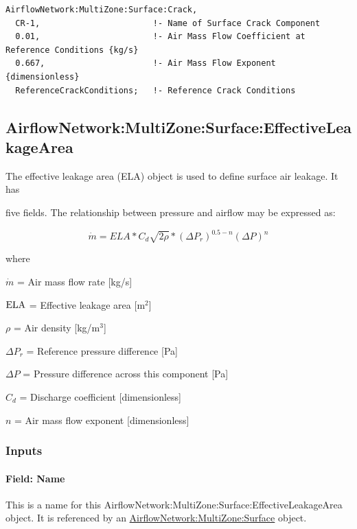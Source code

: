 \begin{lstlisting}
AirflowNetwork:MultiZone:Surface:Crack,
  CR-1,                       !- Name of Surface Crack Component
  0.01,                       !- Air Mass Flow Coefficient at Reference Conditions {kg/s}
  0.667,                      !- Air Mass Flow Exponent {dimensionless}
  ReferenceCrackConditions;   !- Reference Crack Conditions
\end{lstlisting}

\subsection{AirflowNetwork:MultiZone:Surface:EffectiveLeakageArea}\label{airflownetworkmultizonesurfaceeffectiveleakagearea}

The effective leakage area (ELA) object is used to define surface air leakage. It has

five fields. The relationship between pressure and airflow may be expressed as:

\begin{equation}
\dot m = ELA*{C_d}\sqrt {2\rho } *{\left( {\Delta {P_r}} \right)^{0.5 - n}}{\left( {\Delta P} \right)^n}
\end{equation}

where

\(\dot m\) = Air mass flow rate {[}kg/s{]}

\(\rm{ELA}\) = Effective leakage area {[}m\(^{2}\){]}

\(\rho\) = Air density {[}kg/m\(^{3}\){]}

\(\Delta {P_r}\) = Reference pressure difference {[}Pa{]}

\(\Delta P\) = Pressure difference across this component {[}Pa{]}

\(C_{d}\) = Discharge coefficient {[}dimensionless{]}

\(n\) = Air mass flow exponent {[}dimensionless{]}

\subsubsection{Inputs}\label{inputs-3-003}

\paragraph{Field: Name}\label{field-name-3-003}

This is a name for this AirflowNetwork:MultiZone:Surface:EffectiveLeakageArea object. It is referenced by an \hyperref[airflownetworkmultizonesurface]{AirflowNetwork:MultiZone:Surface} object.

